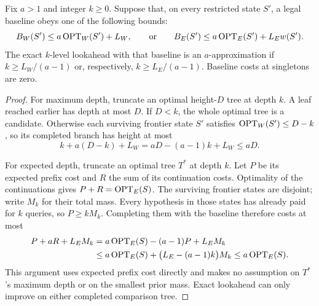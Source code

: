 \begin{lemma}
\label{lem:lookahead-completion}
Fix $a>1$ and integer $k\ge0$. Suppose that, on every restricted
state $S'$, a legal baseline obeys one of the following bounds:
\[
 B_W(S')\le a\operatorname{OPT}_W(S')+L_W,
 \qquad\text{or}\qquad
 B_E(S')\le a\operatorname{OPT}_E(S')+L_Ew(S').
\]
The exact $k$-level lookahead with that baseline is an
$a$-approximation if $k\ge L_W/(a-1)$ or, respectively,
$k\ge L_E/(a-1)$. Baseline costs at singletons are zero.
\end{lemma}
\begin{proof}
For maximum depth, truncate an optimal height-$D$ tree at depth
$k$. A leaf reached earlier has depth at most $D$. If $D<k$,
the whole optimal tree is a candidate. Otherwise each surviving
frontier state $S'$ satisfies $\operatorname{OPT}_W(S')\le D-k$, so its completed
branch has height at most
\[
 k+a(D-k)+L_W=aD-(a-1)k+L_W\le aD.
\]

For expected depth, truncate an optimal tree $T^*$ at depth $k$.
Let $P$ be its expected prefix cost and $R$ the sum of its continuation
costs. Optimality of the continuations gives
$P+R=\operatorname{OPT}_E(S)$. The surviving frontier states are disjoint; write
$M_k$ for their total mass. Every hypothesis in those states has
already paid for $k$ queries, so $P\ge kM_k$. Completing them with
the baseline therefore costs at most
\begin{align*}
 P+aR+L_EM_k
 & =a\operatorname{OPT}_E(S)-(a-1)P+L_EM_k\\
 &\le a\operatorname{OPT}_E(S)+\bigl(L_E-(a-1)k\bigr)M_k
 \le a\operatorname{OPT}_E(S).
\end{align*}
This argument uses expected prefix cost directly and makes no
assumption on $T^*$'s maximum depth or on the smallest prior mass.
Exact lookahead can only improve on either completed comparison tree.
\end{proof}





